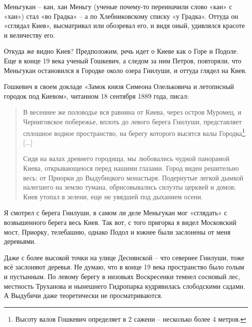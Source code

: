 Меньгукан – кан, хан Меньгу (ученые почему-то переиначили слово «кан» с «хан») стал «во Градка» – а по Хлебниковскому списку «у Градка». Оттуда он «сглядал Киев», высматривал или обозревал его, и видя оный, удивлялся красоте и величеству его.

Откуда же видно Киев? Предположим, речь идет о Киеве как о Горе и Подоле. Еще в конце 19 века ученый Гошкевич, а следом за ним Петров, повторяли, что Меньгукан остановился в Городке около озера Гнилуши, и оттуда глядел на Киев.

Гошкевич в своем докладе «Замок князя Симеона Олельковича и летописный городок под Киевом», читанном 18 сентября 1889 года, писал:

\begin{quotation}
В весеннее же половодье вся равнина от Киева, через остров Муромец, и Черниговское побережье, вплоть до левого берега Гнилуши, представляет сплошное водное пространство, на берегу которого высятся валы Городка\footnote{Высоту валов Гошкевич определяет в 2 сажени – несколько более 4 метров.}. [...]

Сидя на валах древнего городища, мы любовались чудной панорамой Киева, открывающеюся перед нашими глазами. Город виден решительно весь: от Приорки до Выдубицкого монастыря. Подернутые легкой дымкой налегшего на землю тумана, обрисовывались силуэты церквей и домов; Киев утопал в зелени, еще не увядшей под дыханием осени.
\end{quotation}

Я смотрел с берега Гнилуши, в самом ли деле Меньгукан мог «сглядать» с возвышенного берега весь Киев. Так вот, с того пригорка я видел Московский мост, Приорку, телебашню, однако Подол и южнее были заслонены от меня деревьями.

Даже с более высокой точки на улице Деснянской  – что севернее Гнилуши, тоже всё заслоняют деревья. Не думаю, что в конце 19 века пространство было голым и пустынным. По левому берегу в низовьях Воскресенки темнел сосновый лес, местность Труханова и нынешнего Гидропарка кудрявилась слободскими садами. А Выдубичи даже теоретически не просматриваются.
